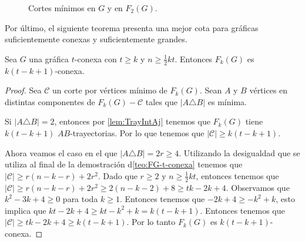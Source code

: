 \begin{figure}[ht!]
    \caption{Cortes m\'inimos en $G$ y en $F_2(G)$.}
    \label{fig:ex-tConect}
    \end{figure}

Por \'ultimo, el siguiente teorema presenta una mejor cota para gr\'aficas
suficientemente conexas y suficientemente grandes.

\begin{teorema}%
    \label{teo:FG_k(t- k+ 1)-conexa}
        Sea $G$ una gr\'afica $t$-conexa con $t \ge k$ y $n \ge \frac{1}{2} kt$.
        Entonces $F_{k}(G)$ es $k (t- k+ 1)$-conexa.
    \end{teorema}

    \begin{proof}
        Sea $\mathcal{C}$ un corte por v\'ertices m\'inimo de $F_k(G)$. Sean
        $A$ y $B$ v\'ertices en distintas componentes de $F_k(G)- \mathcal{C}$
        tales que $|A \triangle B|$ es m\'inima.

        Si $|A \triangle B| = 2$, entonces por \cref{lem:TrayIntAj} tenemos que
        $F_k(G)$ tiene $k (t- k+ 1)$ $AB$-trayectorias. Por lo que tenemos que
        $|\mathcal{C}| \geq k (t- k+ 1)$.

        Ahora veamos el caso en el que $|A \triangle B| = 2r \ge 4$. Utilizando
        la desigualdad que se utiliza al final de la demostraci\'on
        d\cref{teo:FG-t-conexa} tenemos que $|\mathcal{C}| \ge r(n-k-r)+2r^2$. Dado
        que $r \ge 2$ y $n \ge \frac{1}{2}kt$, entonces tenemos que
        $|\mathcal{C}| \ge r(n-k-r)+2r^2 \ge 2 (n- k -2) + 8 \ge tk - 2k+ 4$.
        Observamos que $k^2 -3k + 4 \ge 0$ para toda $k \ge 1$. Entonces tenemos
        que $-2k+4 \ge -k^2 + k$, esto implica que $kt -2k +4 \ge kt - k^2 + k =
        k (t - k +1)$. Entonces tenemos que $|\mathcal{C}| \ge tk -2k +4 \ge
        k(t-k+1)$. Por lo tanto $F_k(G)$ es $k(t-k+1)$-conexa.
    \end{proof}